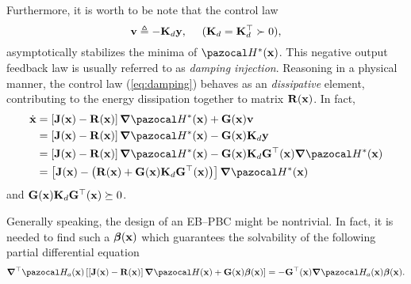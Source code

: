 Furthermore, it is worth to be note that the control law 
\begin{equation}\label{eq:damping}
    \mathbf{v}\triangleq -\mathbf{K}_{d}\mathbf{y},~~~~(\mathbf{K}_d = \mathbf{K}_d^\top \succ 0),
\end{equation}
%
asymptotically stabilizes the minima of $\Ha^*(\xb)$. This negative output feedback law is usually referred to as \textit{damping injection}. Reasoning in a physical manner, the control law (\ref{eq:damping}) behaves as an \textit{dissipative} element, contributing to the {energy dissipation} together to matrix $\mathbf{R}(\mathbf{x})$. In fact,
%
\begin{align}
    \dot{\xb} &= \left[\mathbf{J}(\xb) - \mathbf{R}(\xb)\right]\bm{\nabla}\Ha^*(\xb) + \mathbf{G}(\xb)\mathbf{v} \\
    &= \left[\mathbf{J}(\xb) - \mathbf{R}(\xb)\right]\bm{\nabla}\Ha^*(\xb) - \mathbf{G}(\xb)\mathbf{K}_{d}\yb\\
    &= \left[\mathbf{J}(\xb) - \mathbf{R}(\xb)\right]\bm{\nabla}\Ha^*(\xb) - \mathbf{G}(\xb)\mathbf{K}_{d}\mathbf{G}^\top(\xb)\bm{\nabla}\Ha^*(\xb)\\
    &=\left[\mathbf{J}(\xb) - \left(\mathbf{R}(\xb) + \mathbf{G}(\xb)\mathbf{K}_{d}\mathbf{G}^\top(\xb)\right)\right]\bm{\nabla}\Ha^*(\xb) 
\end{align}
and $\mathbf{G}(\mathbf{x})\mathbf{K}_{d}\mathbf{G}^\top(\mathbf{x})\succeq 0$.
%
\begin{rem}
    Generally speaking, the design of an EB--PBC might be nontrivial. In fact, it is needed to find such a $\bm\beta(\mathbf{x})$ which guarantees the solvability of the following partial differential equation
    \begin{equation}
        \bm\nabla^\top \Ha_a(\xb)\left[\left[\mathbf{J}(\xb)-\mathbf{R}(\xb)\right]\bm\nabla\Ha(\xb) + \mathbf{G}(\xb)\bm\beta(\xb)\right] = -\mathbf{G}^\top(\xb)\bm\nabla\Ha_a(\xb)\bm\beta(\xb).
    \end{equation}
\end{rem}
%

